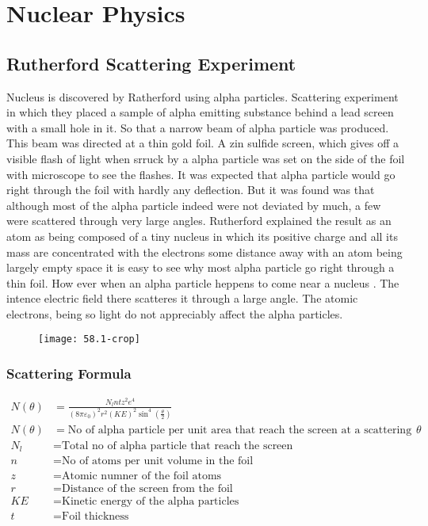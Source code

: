 \chapter{Nuclear Physics}
\section{Rutherford Scattering Experiment}
Nucleus is discovered by Ratherford using alpha particles. Scattering experiment in which they placed a sample of alpha emitting substance behind a lead screen with a small hole in it. So that a narrow beam of alpha particle was produced. This beam was directed at a thin gold foil. A zin sulfide screen, which gives off a visible flash of light when srruck by a alpha particle was set on the side of the foil with microscope to see the flashes. It was expected that alpha particle would go right through the foil with hardly any deflection. But it was found was that although most of the alpha particle indeed were not deviated by much, a few were scattered through very large angles. Rutherford explained the result as an atom as being composed of a tiny nucleus in which its positive charge and all its mass are concentrated with the electrons some distance away with an atom being largely empty space it is easy to see why most alpha particle go right through a thin foil. How ever when an alpha particle heppens to come near a nucleus . The intence electric field there scatteres it through a large angle. The atomic electrons, being so light do not appreciably affect the alpha particles.\\
	\begin{figure}[H]
		\centering
		\texttt{[image: 58.1-crop]}
		\caption{}
		\label{}
	\end{figure}
\subsection{Scattering Formula}
\begin{align*}
N(\theta)&=\frac{N_l nt z^2 e^4}{(8\pi\varepsilon_0)^2r^2(KE)^2\sin^4(\frac{\theta}{2})}\\
N(\theta)&=\text{No of alpha particle per unit area that reach the screen at a scattering angle of $\theta$}\\
N_l&=\text{Total no of alpha particle that reach the screen}\\
n&=\text{No of atoms per unit volume in the foil}\\
z&=\text{Atomic numner of the foil atoms}\\
r&=\text{Distance of the screen from the foil}\\
KE&=\text{Kinetic energy of the alpha particles}\\
t&=\text{Foil thickness}
\end{align*}
